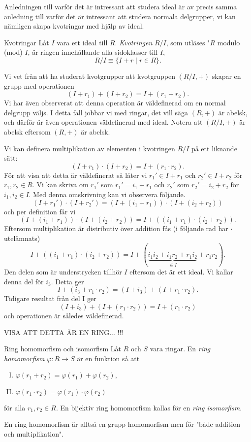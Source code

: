 \documentclass{article}
\theoremstyle{definition}
\begin{document}
Anledningen till varför det är intressant att studera ideal är av precis samma anledning till varför det är intressant att studera normala delgrupper, 
vi kan nämligen skapa kvotringar med hjälp av ideal.

\begin{mydef}{Kvotringar}{}
  Låt $I$ vara ett ideal till $R$. \textit{Kvotringen} $R/I$, som utläses "$R$ modulo (mod) $I$, är ringen innehållande alla sidoklasser till $I$, 
  \[R/I \equiv \{I + r \; | \; r \in R\}.\]
\end{mydef}

Vi vet från att ha studerat kvotgrupper att kvotgruppen $(R/I, +)$ skapar en grupp med operationen 
\[ (I + r_1) + (I + r_2) = I + (r_1 + r_2).\]
Vi har även observerat att denna operation är väldefinerad om en normal delgrupp väljs. I detta fall jobbar vi med ringar, det vill säga 
$(R, +)$ är abelsk, och därför är även operationen väldefinerad med ideal. Notera att $(R/I, +)$ är abelsk eftersom $(R, +)$ är abelsk.

Vi kan definera multiplikation av elementen i kvotringen $R/I$ på ett liknande sätt:
\[(I + r_1) \cdot (I + r_2) = I + (r_1 \cdot r_2). \]
För att visa att detta är väldefinerat så låter vi $r_1' \in I + r_1$ och $r_2' \in I + r_2$ för $r_1, r_2 \in R$. Vi kan skriva 
om $r_1'$ som $r_1' = i_1 + r_1$ och $r_2'$ som $r_2' = i_2 + r_2$ för $i_1, i_2 \in I$. Med denna omskrivning kan vi observera följande.
\[(I + r_1') \cdot (I + r_2') = (I + (i_1 + r_1)) \cdot (I + (i_2 + r_2))\]
och per definition får vi 
\[(I + (i_1 + r_1)) \cdot (I + (i_2 + r_2)) = I + ((i_1 + r_1) \cdot (i_2 + r_2)).\]
Eftersom multiplikation är distributiv över addition fås (i följande rad har $\cdot$ utelämnats)
\[I + ((i_1 + r_1) \cdot (i_2 + r_2)) = I + (\underbrace{i_1  i_2 + i_1  r_2 + r_1  i_2}_{\in I} + r_1  r_2).\]
Den delen som är understrycken tillhör $I$ eftersom det är ett ideal. Vi kallar denna del för $i_3$. Detta ger
\[I + (i_3 + r_1 \cdot r_2) = (I + i_3) + (I + r_1 \cdot r_2).\]
Tidigare resultat från del I ger 
\[(I + i_3) + (I + (r_1 \cdot r_2)) = I + (r_1 \cdot r_2)\]
och operationen är således väldefinerad. 

VISA ATT DETTA ÄR EN RING... !!!

\begin{mydef}{Ring homomorfism och isomorfism}{}
  Låt $R$ och $S$ vara ringar. En \textit{ring homomorfism} $\varphi: R \rightarrow S$ är en funktion så att 
  \begin{enumerate}[I)]
    \item $\varphi(r_1 + r_2) = \varphi(r_1) + \varphi(r_2)$,
    \item $\varphi(r_1 \cdot r_2) = \varphi(r_1) \cdot \varphi(r_2)$
  \end{enumerate}
  för alla $r_1, r_2 \in R$. En bijektiv ring homomorfism kallas för en \textit{ring isomorfism}.
\end{mydef}
En ring homomorfism är alltså en grupp homomorfism men för "både addition och multiplikation".
\end{document}
